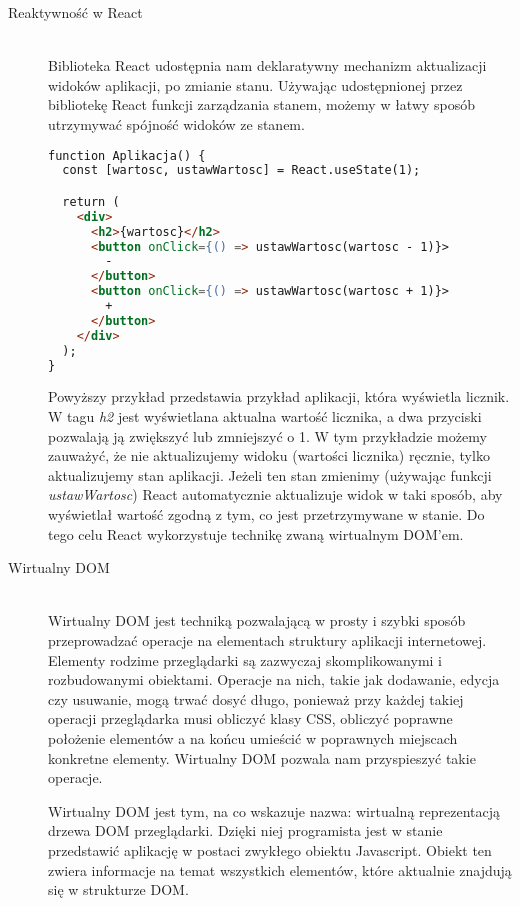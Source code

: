\begin{description}
 \item[Reaktywność w React] \hfill \\ Biblioteka React udostępnia nam deklaratywny mechanizm aktualizacji widoków aplikacji, po zmianie stanu. Używając udostępnionej przez bibliotekę React funkcji zarządzania stanem, możemy w łatwy sposób utrzymywać spójność widoków ze stanem.

\begin{lstlisting}[language=HTML, caption=Użycie mechanizmu zarządzania stanem w React, label={lst:reactCounterCode}]
function Aplikacja() {
  const [wartosc, ustawWartosc] = React.useState(1);

  return (
    <div>
      <h2>{wartosc}</h2>
      <button onClick={() => ustawWartosc(wartosc - 1)}>
        -
      </button>
      <button onClick={() => ustawWartosc(wartosc + 1)}>
        +
      </button>
    </div>
  );
}
\end{lstlisting}

Powyższy przykład przedstawia przykład aplikacji, która wyświetla licznik. W tagu \emph{h2} jest wyświetlana aktualna wartość licznika, a dwa przyciski pozwalają ją zwiększyć lub zmniejszyć o 1. W tym przykładzie możemy zauważyć, że nie aktualizujemy widoku (wartości licznika) ręcznie, tylko aktualizujemy stan aplikacji. Jeżeli ten stan zmienimy (używając funkcji \emph{ustawWartosc}) React automatycznie aktualizuje widok w taki sposób, aby wyświetlał wartość zgodną z tym, co jest przetrzymywane w stanie. Do tego celu React wykorzystuje technikę zwaną wirtualnym DOM'em.

  \item[Wirtualny DOM] \hfill \\ Wirtualny DOM jest techniką pozwalającą w prosty i szybki sposób przeprowadzać operacje na elementach struktury aplikacji internetowej. Elementy rodzime przeglądarki są zazwyczaj skomplikowanymi i rozbudowanymi obiektami. Operacje na nich, takie jak dodawanie, edycja czy usuwanie, mogą trwać dosyć długo, ponieważ przy każdej takiej operacji przeglądarka musi obliczyć klasy CSS, obliczyć poprawne położenie elementów a na końcu umieścić w poprawnych miejscach konkretne elementy. Wirtualny DOM pozwala nam przyspieszyć takie operacje.

  Wirtualny DOM jest tym, na co wskazuje nazwa: wirtualną reprezentacją drzewa DOM przeglądarki. Dzięki niej programista jest w stanie przedstawić aplikację w postaci zwykłego obiektu Javascript. Obiekt ten zwiera informacje na temat wszystkich elementów, które aktualnie znajdują się w strukturze DOM.


\end{description}
